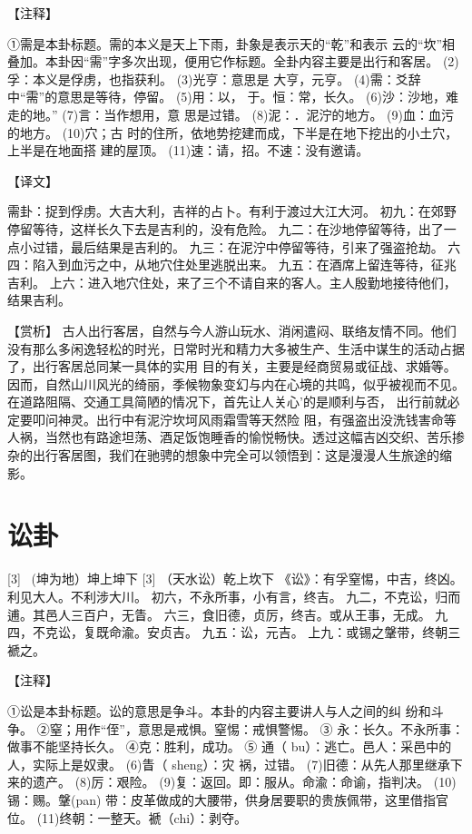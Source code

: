 \documentclass[12pt,UTF8]{ctexbook}
\begin{document}
【注释】

①需是本卦标题。需的本义是天上下雨，卦象是表示天的“乾”和表示 云的“坎”相叠加。本卦因“需”字多次出现，便用它作标题。全卦内容主要是出行和客居。
(2)孚：本义是俘虏，也指获利。
(3)光亨：意思是 大亨，元亨。
(4)需：爻辞中“需”的意思是等待，停留。
(5)用：以， 于。恒：常，长久。
(6)沙：沙地，难走的地。”
(7)言：当作想用，意 思是过错。
(8)泥：．泥泞的地方。
(9)血：血污的地方。
(10)穴；古 时的住所，依地势挖建而成，下半是在地下挖出的小土穴，上半是在地面搭 建的屋顶。
(11)速：请，招。不速：没有邀请。

【译文】

需卦：捉到俘虏。大吉大利，吉祥的占卜。有利于渡过大江大河。
初九：在郊野停留等待，这样长久下去是吉利的，没有危险。
九二：在沙地停留等待，出了一点小过错，最后结果是吉利的。
九三：在泥泞中停留等待，引来了强盗抢劫。
六四：陷入到血污之中，从地穴住处里逃脱出来。
九五：在酒席上留连等待，征兆吉利。
上六：进入地穴住处，来了三个不请自来的客人。主人殷勤地接待他们，结果吉利。

【赏析】
古人出行客居，自然与今人游山玩水、消闲遣闷、联络友情不同。他们没有那么多闲逸轻松的时光，日常时光和精力大多被生产、生活中谋生的活动占据了，出行客居总同某一具体的实用 目的有关，主要是经商贸易或征战、求婚等。因而，自然山川风光的绮丽，季候物象变幻与内在心境的共鸣，似乎被视而不见。在道路阻隔、交通工具简陋的情况下，首先让人关心’的是顺利与否， 出行前就必定要叩问神灵。出行中有泥泞坎坷风雨霜雪等天然险 阻，有强盗出没洗钱害命等人祸，当然也有路途坦荡、酒足饭饱睡香的愉悦畅快。透过这幅吉凶交织、苦乐掺杂的出行客居图，我们在驰骋的想象中完全可以领悟到：这是漫漫人生旅途的缩影。 

\chapter{讼卦}
[3] \ (坤为地）坤上坤下
[3]
（天水讼）乾上坎下
《讼》：有孚窒惕，中吉，终凶。利见大人。不利涉大川。
初六，不永所事，小有言，终吉。
九二，不克讼，归而逋。其邑人三百户，无眚。
六三，食旧德，贞厉，终吉。或从王事，无成。
九四，不克讼，复既命渝。安贞吉。
九五：讼，元吉。
上九：或锡之鞶带，终朝三褫之。

【注释】

①讼是本卦标题。讼的意思是争斗。本卦的内容主要讲人与人之间的纠 纷和斗争。
②窒；用作“侄”，意思是戒惧。窒惕：戒惧警惕。
③ 永：长久。不永所事：做事不能坚持长久。
④克：胜利，成功。
⑤ 通（ bu）：逃亡。邑人：采邑中的人，实际上是奴隶。
(6)眚（ sheng）：灾 祸，过错。
(7)旧德：从先人那里继承下来的遗产。
(8)厉：艰险。
(9)复：返回。即：服从。命渝：命谕，指判决。
(10)锡：赐。鞶(pan) 带：皮革做成的大腰带，供身居要职的贵族佩带，这里借指官位。
(11)终朝：一整天。褫（chi）：剥夺。
\end{document}
